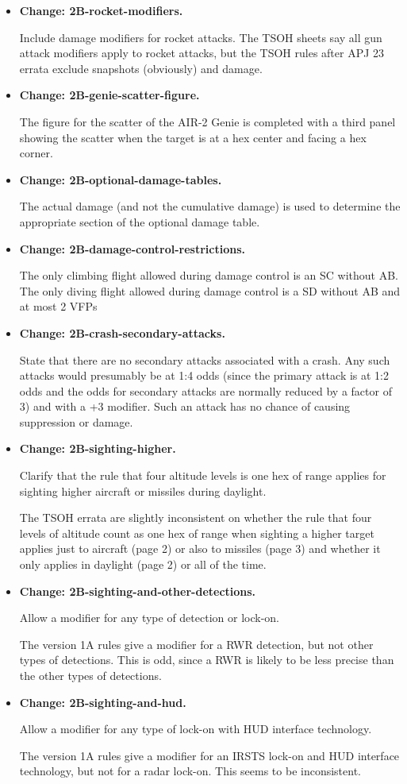 \documentclass[10pt]{report}
\newcommand{\itemtag}[1]{\item \textbf{Change: #1.}\par}
\begin{document}
\begin{itemize}
    \itemtag{2B-rocket-modifiers} Include damage modifiers for rocket attacks. The TSOH sheets say all gun attack modifiers apply to rocket attacks, but the TSOH rules after APJ 23 errata exclude snapshots (obviously) and damage.
        
    \itemtag{2B-genie-scatter-figure} The figure for the scatter of the AIR-2 Genie is completed with a third panel showing the scatter when the target is at a hex center and facing a hex corner.    
    
    \itemtag{2B-optional-damage-tables} The actual damage (and not the cumulative damage) is used to determine the appropriate section of the optional damage table.
    
    \itemtag{2B-damage-control-restrictions} The only climbing flight allowed during damage control is an SC without AB. The only diving flight allowed during damage control is a SD without AB and at most 2 VFPs
    
    \itemtag{2B-crash-secondary-attacks} State that there are no secondary attacks associated with a crash. Any such attacks would presumably be at 1:4 odds (since the primary attack is at 1:2 odds and the odds for secondary attacks are normally reduced by a factor of 3) and with a +3 modifier. Such an attack has no chance of causing suppression or damage.

    \itemtag{2B-sighting-higher} Clarify that the rule that four altitude levels is one hex of range applies for sighting higher aircraft or missiles during daylight.  
    
    The TSOH errata are slightly inconsistent on whether the rule that four levels of altitude count as one hex of range when sighting a higher target applies just to aircraft (page 2) or also to missiles (page 3) and whether it only applies in daylight (page 2) or all of the time.
    
    \itemtag{2B-sighting-and-other-detections} Allow a  modifier for any type of detection or lock-on. 
    
    The version 1A rules give a  modifier for a RWR detection, but not other types of detections. This is odd, since a RWR is likely to be less precise than the other types of detections.
    
    \itemtag{2B-sighting-and-hud} Allow a  modifier for any type of lock-on with HUD interface technology. 
    
    The version 1A rules give a  modifier for an IRSTS lock-on and HUD interface technology, but not for a radar lock-on. This seems to be inconsistent.


\end{itemize}
\end{document}
